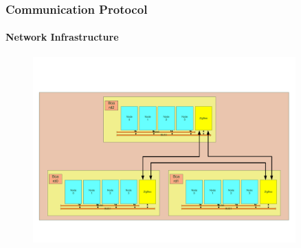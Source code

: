 \documentclass{beamer}
\theoremstyle{definition} \newtheorem{mdefinition}{Definition}
\theoremstyle{plain} \newtheorem{mtheorem}{Theorem}
\theoremstyle{plain} \newtheorem{mcorollary}{Corollary}
\theoremstyle{plain} \newtheorem{mfact}{Fact}
\begin{document}

\begin{frame}
  \frametitle{Communication Protocol}
  \framesubtitle{Network Infrastructure}
  \begin{figure}
    \includegraphics[width=0.9\textwidth]{img/zigbee.pdf}
  \end{figure}
\end{frame}
\end{document}
